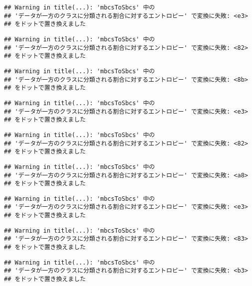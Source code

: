 \documentclass[
]{article}
\begin{document}
\begin{verbatim}
## Warning in title(...): 'mbcsToSbcs' 中の
## 'データが一方のクラスに分類される割合に対するエントロピー' で変換に失敗: <e3>
## をドットで置き換えました
\end{verbatim}

\begin{verbatim}
## Warning in title(...): 'mbcsToSbcs' 中の
## 'データが一方のクラスに分類される割合に対するエントロピー' で変換に失敗: <82>
## をドットで置き換えました
\end{verbatim}

\begin{verbatim}
## Warning in title(...): 'mbcsToSbcs' 中の
## 'データが一方のクラスに分類される割合に対するエントロピー' で変換に失敗: <8b>
## をドットで置き換えました
\end{verbatim}

\begin{verbatim}
## Warning in title(...): 'mbcsToSbcs' 中の
## 'データが一方のクラスに分類される割合に対するエントロピー' で変換に失敗: <e3>
## をドットで置き換えました
\end{verbatim}

\begin{verbatim}
## Warning in title(...): 'mbcsToSbcs' 中の
## 'データが一方のクラスに分類される割合に対するエントロピー' で変換に失敗: <82>
## をドットで置き換えました
\end{verbatim}

\begin{verbatim}
## Warning in title(...): 'mbcsToSbcs' 中の
## 'データが一方のクラスに分類される割合に対するエントロピー' で変換に失敗: <a8>
## をドットで置き換えました
\end{verbatim}

\begin{verbatim}
## Warning in title(...): 'mbcsToSbcs' 中の
## 'データが一方のクラスに分類される割合に対するエントロピー' で変換に失敗: <e3>
## をドットで置き換えました
\end{verbatim}

\begin{verbatim}
## Warning in title(...): 'mbcsToSbcs' 中の
## 'データが一方のクラスに分類される割合に対するエントロピー' で変換に失敗: <83>
## をドットで置き換えました
\end{verbatim}

\begin{verbatim}
## Warning in title(...): 'mbcsToSbcs' 中の
## 'データが一方のクラスに分類される割合に対するエントロピー' で変換に失敗: <b3>
## をドットで置き換えました
\end{verbatim}
\end{document}
